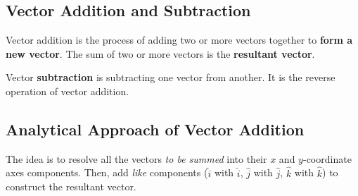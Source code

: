 \documentclass[12pt,b4paper]{article}
\begin{document}
\subsection*{Vector Addition and Subtraction}
Vector addition is the process of adding two or more vectors together to \textbf{form a new vector}. The sum of two or more vectors is the \textbf{resultant vector}.

Vector \textbf{subtraction} is subtracting one vector from another. It is the reverse operation of vector addition.
\subsection*{Analytical Approach of Vector Addition}
The idea is to resolve all the vectors \textit{to be summed} into their $x$ and $y$-coordinate axes components. Then, add \textit{like} components ($\hat{i}$ with $\hat{i}$, $\hat{j}$ with $\hat{j}$, $\hat{k}$ with $\hat{k}$) to construct the resultant vector.
\end{document}
